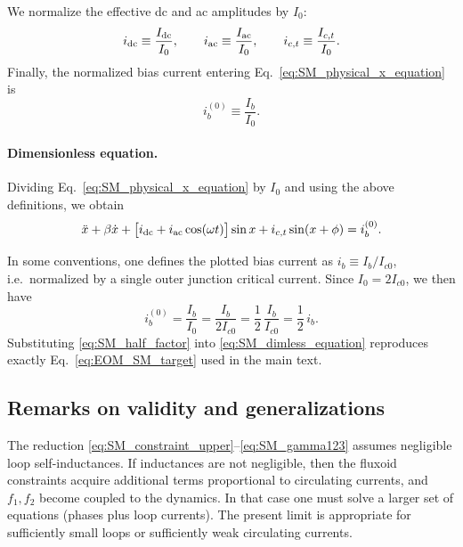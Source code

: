 \documentclass[prl,twocolumn,superscriptaddress,showpacs,nofootinbib]{revtex4-2}
\begin{document}
We normalize the effective dc and ac amplitudes by $I_0$:
\begin{equation}
i_{\rm dc}\equiv \frac{I_{\rm dc}}{I_0},
\qquad
i_{\rm ac}\equiv \frac{I_{\rm ac}}{I_0},
\qquad
i_{c,t}\equiv \frac{I_{c,t}}{I_0}.
\label{eq:SM_idc_iac_ict_def}
\end{equation}
Finally, the normalized bias current entering Eq.~\eqref{eq:SM_physical_x_equation} is
\begin{equation}
i_b^{(0)}\equiv \frac{I_b}{I_0}.
\label{eq:SM_ib0_def}
\end{equation}

\paragraph*{Dimensionless equation.}
Dividing Eq.~\eqref{eq:SM_physical_x_equation} by $I_0$ and using the above
definitions, we obtain
\begin{equation}
\ddot x + \beta \dot x
+ \big[i_{\rm dc}+i_{\rm ac}\cos(\omega t)\big]\sin x
+ i_{c,t}\sin(x+\phi)
= i_b^{(0)}.
\label{eq:SM_dimless_equation}
\end{equation}

In some conventions, one defines the plotted bias current as
$i_b \equiv I_b/I_{c0}$, i.e.\ normalized by a single outer junction
critical current. Since $I_0=2I_{c0}$, we then have
\begin{equation}
i_b^{(0)}=\frac{I_b}{I_0}=\frac{I_b}{2I_{c0}}=\frac{1}{2}\,\frac{I_b}{I_{c0}}
=\frac{1}{2}\,i_b.
\label{eq:SM_half_factor}
\end{equation}
Substituting \eqref{eq:SM_half_factor} into \eqref{eq:SM_dimless_equation}
reproduces exactly Eq.~\eqref{eq:EOM_SM_target} used in the main text.

\subsection{Remarks on validity and generalizations}
\label{sec:SM_validity}

The reduction \eqref{eq:SM_constraint_upper}--\eqref{eq:SM_gamma123} assumes negligible loop self-inductances. If inductances are not negligible, then the fluxoid constraints acquire additional terms proportional to circulating currents, and $f_1,f_2$ become coupled to the dynamics. In that case one must solve a larger set of equations (phases plus loop currents). The present limit is appropriate for sufficiently small loops or sufficiently weak circulating
currents.
\end{document}
